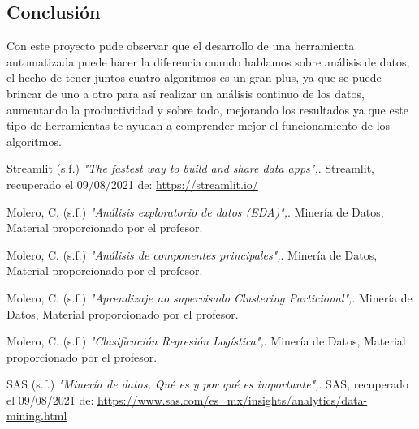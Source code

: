\documentclass[10pt,a4paper]{article}
\begin{document}
\subsection*{Conclusión}
    Con este proyecto pude observar que el desarrollo de una herramienta automatizada puede hacer la diferencia cuando hablamos sobre análisis de datos, el hecho de tener juntos cuatro algoritmos es un gran plus, ya que se puede brincar de uno a otro para así realizar un análisis continuo de los datos, aumentando la productividad y sobre todo, mejorando los resultados ya que este tipo de herramientas te ayudan a comprender mejor el funcionamiento de los algoritmos. 
    

 \begin{thebibliography}{9}
      Streamlit (s.f.) 
     \emph{"The fastest way to build and share data apps",}.
     Streamlit, recuperado el 09/08/2021 de: \url{https://streamlit.io/}
     
     Molero, C. (s.f.) 
     \emph{"Análisis exploratorio de datos
        (EDA)",}.
     Minería de Datos, Material proporcionado por el profesor. 
     
     
     Molero, C. (s.f.) 
     \emph{"Análisis de componentes principales",}.
     Minería de Datos, Material proporcionado por el profesor. 
    
     Molero, C. (s.f.) 
     \emph{"Aprendizaje no supervisado
        Clustering Particional",}.
     Minería de Datos, Material proporcionado por el profesor. 
     
     Molero, C. (s.f.) 
     \emph{"Clasificación Regresión Logística",}.
     Minería de Datos, Material proporcionado por el profesor.
     
      SAS (s.f.) 
     \emph{"Minería de datos, Qué es y por qué es importante",}.
     SAS, recuperado el 09/08/2021 de: \url{https://www.sas.com/es_mx/insights/analytics/data-mining.html}
    
\end{thebibliography}
\end{document}
